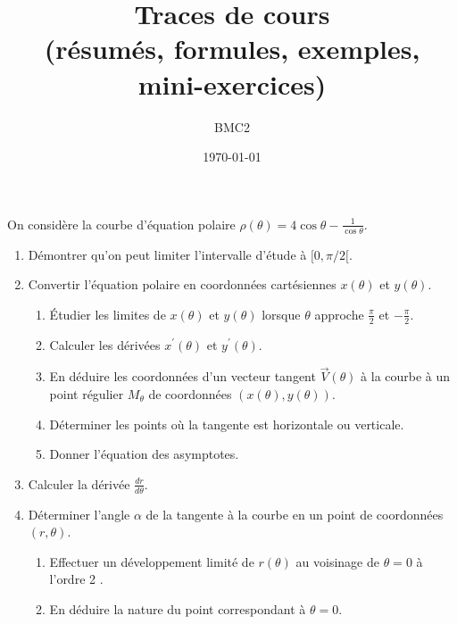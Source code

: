 \documentclass[11pt,a4paper]{report}
\title{\textbf{Traces de cours}\\\large (résumés, formules, exemples, mini-exercices)}
\author{ BMC2 }
\date{\today}
\begin{document}
On considère la courbe d'équation polaire $\rho(\theta)=4 \cos \theta-\frac{1}{\cos \theta}$.

\begin{enumerate}
  \item Démontrer qu'on peut limiter l'intervalle d'étude à $[0, \pi / 2[$.

  \item Convertir l'équation polaire en coordonnées cartésiennes $x(\theta)$ et $y(\theta)$.
  \begin{enumerate}
    \item Étudier les limites de $x(\theta)$ et $y(\theta)$ lorsque $\theta$ approche $\frac{\pi}{2}$ et $-\frac{\pi}{2}$.
    \item Calculer les dérivées $x^{\prime}(\theta)$ et $y^{\prime}(\theta)$.
    \item En déduire les coordonnées d'un vecteur tangent $\vec{V}(\theta)$ à la courbe à un point régulier $M_\theta$ de coordonnées $(x(\theta), y(\theta))$.
    \item Déterminer les points où la tangente est horizontale ou verticale.
    \item Donner l'équation des asymptotes.
  \end{enumerate}

  \item Calculer la dérivée $\frac{d r}{d \theta}$.
  \item Déterminer l'angle $\alpha$ de la tangente à la courbe en un point de coordonnées $(r, \theta)$.
  \begin{enumerate}
    \item Effectuer un développement limité de $r(\theta)$ au voisinage de $\theta=0$ à l'ordre 2 .
    \item En déduire la nature du point correspondant à $\theta=0$.
  \end{enumerate}
\end{enumerate}
\end{document}
